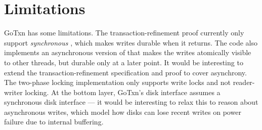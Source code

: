 





\section{Limitations}
\label{sec:txn:limitations}

GoTxn has some limitations. The transaction-refinement proof currently only support
\emph{synchronous} , which makes writes durable when it returns. The
code also implements an asynchronous version of  that makes the
writes atomically visible to other threads, but durable only at a later point.
It would be interesting to extend the transaction-refinement specification and proof
to cover asynchrony. The two-phase locking implementation only supports write
locks and not reader-writer locking. At the bottom layer, GoTxn's disk interface
assumes a synchronous disk interface --- it would be interesting to relax this
to reason about asynchronous writes, which model how disks can lose recent
writes on power failure due to internal buffering.


